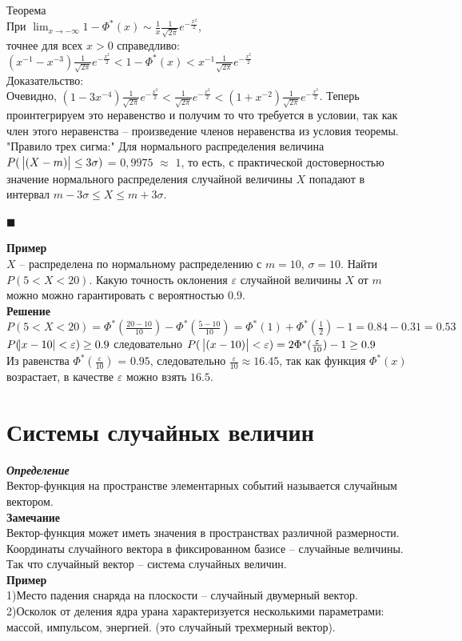 \documentclass[russian, 12pt, fleqn,x11names]{article}
\begin{document}
$\textbf{Теорема}$\\
При $\displaystyle{  \lim_{x\to{-\infty}}  } 1 - \Phi^*(x) \sim  \frac{1}{x} \frac{1}{\sqrt{2\pi}} e^{-\frac{x^2}{2}}  $,\\ точнее для всех $x  > 0$ справедливо:
$(x^{-1} - x^{-3})\frac{1}{\sqrt{2\pi}}e^{-\frac{x^2}{2}} < 1 - \Phi^*(x) < x^{-1}\frac{1}{\sqrt{2\pi}} e^{-\frac{x^2}{2}}$\\
Доказательство:\\
Очевидно, $(1-3x^{-4})\frac{1}{\sqrt{2\pi}} e^{-\frac{x^2}{2}} < \frac{1}{\sqrt{2\pi}} e ^{- \frac{x^2}{2} } < (1 + x^{-2}) \frac{1}{\sqrt{2\pi}} e^{-\frac{x^2}{2}}$. Теперь проинтегрируем это неравенство  и получим то что требуется в условии, так как член этого неравенства -- произведение членов неравенства из условия теоремы.\\
"Правило трех сигма:" Для нормального распределения величина\\ $P(\ \abs{(X-m)} \leq 3\sigma)$ = $0,9975$ $\approx$ $1$, то есть, с практической достоверностью значение нормального распределения случайной величины $X$ попадают в интервал $m-3\sigma\leq X \leq m+ 3\sigma$.
\begin{flushright}\(\blacksquare\)\end{flushright}
\textbf{Пример} \\
$X$ -- распределена по нормальному распределению с $m=10$, $\sigma=10$. Найти $P(5<X<20)$. Какую точность оклонения $\varepsilon$ случайной величины $X$ от $m$ можно можно гарантировать с вероятностью $0.9$.\\
\textbf{Решение}\\
$P(5<X<20)  = \Phi^*(\frac{20 - 10}{10}) - \Phi^*(\frac{5 - 10}{10}) = \Phi^*(1) + \Phi^*(\frac{1}{2}) - 1 = 0.84 - 0.31 = 0.53$\\ 
$P(\abs{x - 10} < \varepsilon) \geq 0.9$ следовательно $P(\ \abs{(x - 10)} < \varepsilon) = 2\Phi^*(\frac{\varepsilon}{10}) - 1 \geq 0.9$\\
Из равенства $\Phi^*(\frac{\varepsilon}{10}) $ = $0.95$, следовательно $\frac{\varepsilon}{10} \approx 16.45$, так как функция $ \Phi^*(x)$ возрастает, в качестве
 $\varepsilon$ можно взять $16.5$.
\newpage
\section{Системы случайных величин}
\noindent
\textit{\textbf{Определение}}\\
Вектор-функция на пространстве элементарных событий называется случайным вектором.\\
\textbf{Замечание\ } \\
Вектор-функция может иметь значения в пространствах различной размерности.\\
Координаты случайного вектора в фиксированном базисе -- случайные величины. Так что случайный вектор -- система случайных величин.\\
\textbf{Пример}\\
1)Место падения снаряда на плоскости -- случайный двумерный вектор.\\
2)Осколок от деления ядра урана характеризуется несколькими параметрами: массой, импульсом, энергией. (это случайный трехмерный вектор).
\end{document}
